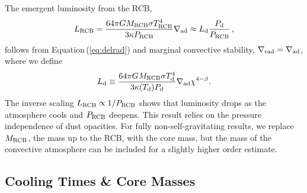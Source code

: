 \documentclass[apj, numberedappendix]{emulateapj}
\newcommand{\Eq}[1]{Equation\,(\ref{#1})}
\newcommand{\delad}{\nabla_{\rm ad}}
\newcommand{\delrad}{\nabla_{\rm rad}}
\newcommand{\RB}{R_{\rm B}}
\newcommand{\co}{_{\rm c}}
\newcommand{\di}{_{\rm d}}
\newcommand{\cb}{_{\rm RCB}}
\begin{document}
The emergent luminosity from the RCB, 
\begin{equation} \label{eq:Lcb}
L\cb = {64 \pi G M\cb \sigma T\cb^4 \over 3 \kappa P\cb } \nabla_{\rm ad} \approx L\di {P_{\rm d} \over P\cb}\, , %
\end{equation} 
follows from \Eq{eq:delrad} and marginal convective stability, $\delrad = \delad$, where we define 
\begin{equation} 
L\di \equiv {64 \pi G M\cb \sigma T_{\rm d}^4 \over 3 \kappa(T_{\rm d}) P_{\rm d}} \nabla_{\rm ad}\chi^{4-\beta}.
\end{equation} 
The inverse scaling $L\cb \propto 1/P\cb$ shows that luminosity drops as the atmosphere cools and $P\cb$ deepens.  This result relies on the pressure independence of  dust opacities.  For fully non-self-gravitating results, we replace $M\cb$, the mass up to the RCB, with the core mass, but the mass of the convective atmosphere can be included for a slightly higher order estimate.

\subsection{Cooling Times \& Core Masses}
\label{coolingan}
\end{document}
